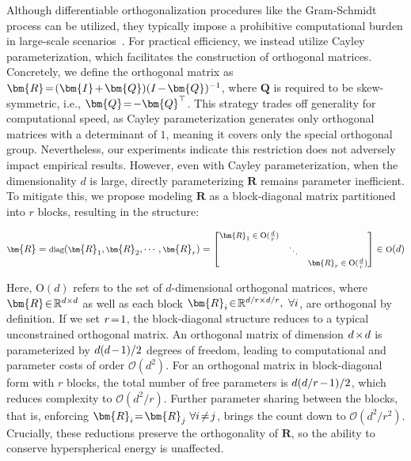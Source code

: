 Although differentiable orthogonalization procedures like the Gram-Schmidt process can be utilized, they typically impose a prohibitive computational burden in large-scale scenarios~\cite{liu2021orthogonal}. For practical efficiency, we instead utilize Cayley parameterization, which facilitates the construction of orthogonal matrices. Concretely, we define the orthogonal matrix as $\thickmuskip=2mu \medmuskip=2mu \bm{R}=(\bm{I}+\bm{Q})(I-\bm{Q})^{-1}$, where $\bm{Q}$ is required to be skew-symmetric, i.e., $\thickmuskip=2mu \medmuskip=2mu \bm{Q}=-\bm{Q}^\top$. This strategy trades off generality for computational speed, as Cayley parameterization generates only orthogonal matrices with a determinant of $1$, meaning it covers only the special orthogonal group. Nevertheless, our experiments indicate this restriction does not adversely impact empirical results. However, even with Cayley parameterization, when the dimensionality $d$ is large, directly parameterizing $\bm{R}$ remains parameter inefficient. To mitigate this, we propose modeling $\bm{R}$ as a block-diagonal matrix partitioned into $r$ blocks, resulting in the structure:

\begin{equation}
    \footnotesize
    \bm{R}=\text{diag}(\bm{R}_1,\bm{R}_2,\cdots,\bm{R}_r)=\begin{bmatrix}
    \bm{R}_1\in \text{O}(\frac{d}{r}) &  &\\
    &\ddots & \\
    & & \bm{R}_r\in \text{O}(\frac{d}{r})
    \end{bmatrix}\in \text{O}(d)
\end{equation}

Here, $\text{O}(d)$ refers to the set of $d$-dimensional orthogonal matrices, where $\thickmuskip=2mu \medmuskip=2mu \bm{R}\in\mathbb{R}^{d\times d}$ as well as each block $\thickmuskip=2mu \medmuskip=2mu \bm{R}_i\in\mathbb{R}^{d/r\times d/r},~\forall i$, are orthogonal by definition. If we set $\thickmuskip=2mu \medmuskip=2mu r=1$, the block-diagonal structure reduces to a typical unconstrained orthogonal matrix. An orthogonal matrix of dimension $\thickmuskip=2mu \medmuskip=2mu d\times d$ is parameterized by $\thickmuskip=2mu \medmuskip=2mu d(d-1)/2$ degrees of freedom, leading to computational and parameter costs of order $\mathcal{O}(d^2)$. For an orthogonal matrix in block-diagonal form with $r$ blocks, the total number of free parameters is $\thickmuskip=2mu \medmuskip=2mu d(d/r-1)/2$, which reduces complexity to $\mathcal{O}(d^2/r)$. Further parameter sharing between the blocks, that is, enforcing $\thickmuskip=2mu \medmuskip=2mu\bm{R}_i = \bm{R}_j~\forall i\neq j$, brings the count down to $\mathcal{O}(d^2/r^2)$. Crucially, these reductions preserve the orthogonality of $\bm{R}$, so the ability to conserve hyperspherical energy is unaffected.

